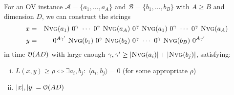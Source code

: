 \begin{theorem}
\label{thm:small_lcs_construction}
	For an OV instance $\mathcal{A} = \{a_1, \ldots, a_A\}$ and $\mathcal{B} = \{b_1, \ldots, b_B\}$ with $A \geq B$ and dimension $D$, we can construct the strings
\begin{align*}
	x &=& \nvg{a_1}\ 0^\gamma\ \cdots\ 0^\gamma\ \nvg{a_A}\ &0^\gamma\ %
	\nvg{a_1}\ 0^\gamma\ \cdots\ 0^\gamma\ \nvg{a_A}\\
	y&=& 0^{A\gamma'}\ \nvg{b_1}\ 0^{\gamma}\ \nvg{b_2}\ &0^\gamma\ \cdots\ 0^\gamma\ \nvg{b_B}\ 0^{A\gamma'}
\end{align*}
%
in time $\mathcal{O}(AD)$ with large enough $\gamma, \gamma' \geq |\text{\textsc{Nvg}}(a_i)| + |\text{\textsc{Nvg}}(b_j)|$, satisfying:

\begin{enumerate}[(i)]
    \item\label{thm:small_lcs_construction:infer} $L(x,y) \geq \rho \Leftrightarrow \exists a_i, b_j:\; \langle a_i,b_j \rangle = 0$ \quad\quad (for some appropriate $\rho$)

    \item\label{thm:small_lcs_construction:size} $|x|, |y| = \mathcal{O}(AD)$
\end{enumerate}
\end{theorem}	




%	
%
%	
%	
%	
%	
%	


